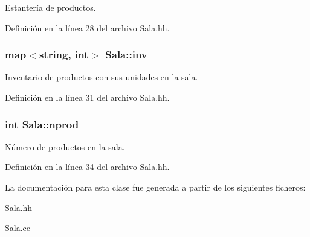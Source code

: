 Estantería de productos. 



Definición en la línea 28 del archivo Sala.\+hh.

\subsubsection[{\texorpdfstring{inv}{inv}}]{\setlength{\rightskip}{0pt plus 5cm}map$<$string, int$>$ Sala\+::inv\hspace{0.3cm}{\ttfamily [private]}}\hypertarget{class_sala_a2d8fbc50706513567b0d975ed0f2e66e}{}\label{class_sala_a2d8fbc50706513567b0d975ed0f2e66e}


Inventario de productos con sus unidades en la sala. 



Definición en la línea 31 del archivo Sala.\+hh.

\subsubsection[{\texorpdfstring{nprod}{nprod}}]{\setlength{\rightskip}{0pt plus 5cm}int Sala\+::nprod\hspace{0.3cm}{\ttfamily [private]}}\hypertarget{class_sala_a829a224601bc03ff2355501639907033}{}\label{class_sala_a829a224601bc03ff2355501639907033}


Número de productos en la sala. 



Definición en la línea 34 del archivo Sala.\+hh.



La documentación para esta clase fue generada a partir de los siguientes ficheros\+:\begin{DoxyCompactItemize}
\item 
\hyperlink{_sala_8hh}{Sala.\+hh}\item 
\hyperlink{_sala_8cc}{Sala.\+cc}\end{DoxyCompactItemize}
